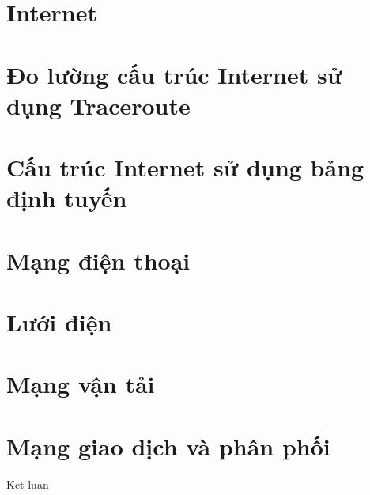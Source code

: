 


\chapter{Internet}
\chapter{Đo lường cấu trúc Internet sử dụng Traceroute}
\chapter{Cấu trúc Internet sử dụng bảng định tuyến}
\chapter{Mạng điện thoại}
\chapter{Lưới điện}
\chapter{Mạng vận tải}
\chapter{Mạng giao dịch và phân phối}

Ket-luan



